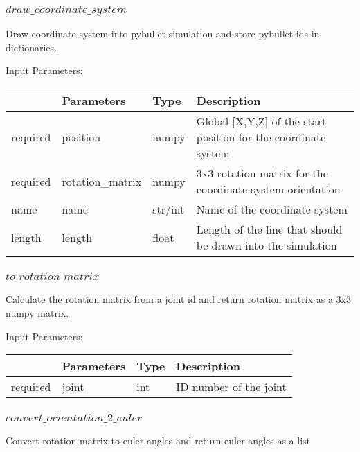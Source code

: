 \documentclass[
	ngerman,
	accentcolor=9c,%
	type=intern,
	marginpar=false
	]{tudapub}
\begin{document}
\subsubsection{$draw\_coordinate\_system$}
\noindent Draw coordinate system into pybullet simulation and store pybullet ids in dictionaries.

\vspace{0.5cm}
\noindent Input Parameters:
\vspace{0.5cm}

\begin{tabular}{|p{}|p{}|p{}| p{}|}
\hline
 & \textbf{Parameters} & \textbf{Type} & \textbf{Description} \\
\hline
required & position & numpy & Global [X,Y,Z] of the start position for the coordinate system \\
\hline
required & rotation\_matrix & numpy & 3x3 rotation matrix for the coordinate system orientation \\
\hline
name & name & str/int & Name of the coordinate system \\
\hline
length & length & float & Length of the line that should be drawn into the simulation \\
\hline
\end{tabular}
\vspace{1cm}


\subsubsection{$to\_rotation\_matrix$}
\noindent Calculate the rotation matrix from a joint id and return rotation matrix as a 3x3 numpy matrix.

\vspace{0.5cm}
\noindent Input Parameters:
\vspace{0.5cm}

\begin{tabular}{|p{}|p{}|p{}| p{}|}
\hline
 & \textbf{Parameters} & \textbf{Type} & \textbf{Description} \\
\hline
required & joint & int & ID number of the joint \\
\hline
\end{tabular}
\vspace{1cm}

\subsubsection{$convert\_orientation\_2\_euler$}
\noindent Convert rotation matrix to euler angles and return euler angles as a list
\end{document}
